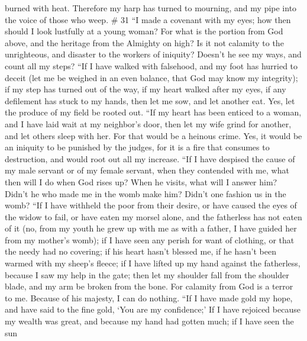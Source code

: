 burned with heat.  Therefore my harp has turned to
mourning, and my pipe into the voice of those who weep. \# 31
 ``I made a covenant with my eyes; how then should I look
lustfully at a young woman?  For what is the portion from
God above, and the heritage from the Almighty on high?  Is
it not calamity to the unrighteous, and disaster to the workers of
iniquity?  Doesn't he see my ways, and count all my steps?
 ``If I have walked with falsehood, and my foot has
hurried to deceit  (let me be weighed in an even balance,
that God may know my integrity);  if my step has turned
out of the way, if my heart walked after my eyes, if any defilement has
stuck to my hands,  then let me sow, and let another eat.
Yes, let the produce of my field be rooted out.  ``If my
heart has been enticed to a woman, and I have laid wait at my neighbor's
door,  then let my wife grind for another, and let others
sleep with her.  For that would be a heinous crime. Yes,
it would be an iniquity to be punished by the judges, 
for it is a fire that consumes to destruction, and would root out all my
increase.  ``If I have despised the cause of my male
servant or of my female servant, when they contended with me,
 what then will I do when God rises up? When he visits,
what will I answer him?  Didn't he who made me in the
womb make him? Didn't one fashion us in the womb?  ``If I
have withheld the poor from their desire, or have caused the eyes of the
widow to fail,  or have eaten my morsel alone, and the
fatherless has not eaten of it  (no, from my youth he
grew up with me as with a father, I have guided her from my mother's
womb);  if I have seen any perish for want of clothing,
or that the needy had no covering;  if his heart hasn't
blessed me, if he hasn't been warmed with my sheep's fleece;
 if I have lifted up my hand against the fatherless,
because I saw my help in the gate;  then let my shoulder
fall from the shoulder blade, and my arm be broken from the bone.
 For calamity from God is a terror to me. Because of his
majesty, I can do nothing.  ``If I have made gold my
hope, and have said to the fine gold, `You are my confidence;'
 If I have rejoiced because my wealth was great, and
because my hand had gotten much;  if I have seen the sun
